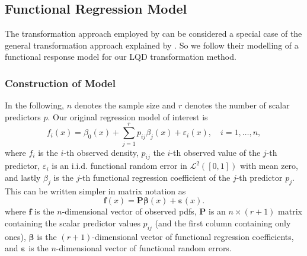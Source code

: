 \subsection{Functional Regression Model}
\label{sec:func_reg_model}
The transformation approach employed by \textcite{TalskaEtAl2018} can be considered a
special case of the general transformation approach explained by \textcite{PetersenMüller2016}
\parencite[cf.][]{PetersenZhangKokoszka2022}. So we follow their modelling of a functional
response model for our LQD transformation method.

\subsubsection{Construction of Model}
\label{sec:model_construction}
In the following, $n$ denotes the sample size and $r$ denotes the number of scalar
predictors $p$. Our original regression model of interest is
\begin{equation}
    \label{eq:dens_reg_model}
    f_i(x) = \beta_0(x) + \sum_{j=1}^{r} p_{ij} \beta_j(x) + \varepsilon_i(x), \quad i = 1, \ldots, n,
\end{equation}
where $f_i$ is the $i$-th observed density, $p_{ij}$ the $i$-th observed value of the
$j$-th predictor, $\varepsilon_i$ is an i.i.d. functional random error in $\mathcal{L}^2([0,1])$
with mean zero, and lastly $\beta_j$ is the $j$-th functional regression coefficient of the $j$-th
predictor $p_j$. This can be written simpler in matrix notation as
\begin{equation}
    \label{eq:dens_reg_model_matrix}
    \mathbf{f}(x) = \mathbf{P} \boldsymbol{\beta}(x) + \boldsymbol{\varepsilon}(x).
\end{equation}
where $\mathbf{f}$ is the $n$-dimensional vector of observed pdfs, $\mathbf{P}$ is an $n \times (r+1)$
matrix containing the scalar predictor values $p_{ij}$ (and the first column containing only
ones), $\boldsymbol{\beta}$ is the $(r+1)$-dimensional vector of functional regression coefficients,
and $\boldsymbol{\varepsilon}$ is the $n$-dimensional vector of functional random errors.

